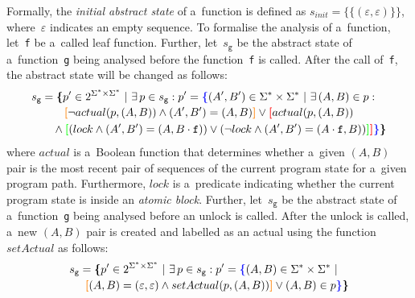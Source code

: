 Formally, the \emph{initial abstract state} of a~function is defined as $ s_{init} = \{\{(\varepsilon, \varepsilon)\}\} $, where~$\varepsilon $ indicates an empty sequence. To formalise the analysis of a~function, let~\texttt{f} be a~called leaf function. Further, let~$ s_\mathtt{g} $ be the abstract state of a~function~\texttt{g} being analysed before the function~\texttt{f} is called. After the call of~\texttt{f}, the abstract state will be changed as follows:
$$
\begin{multlined}
    s_\mathtt{g} = \bb{\{}p^\prime \in 2^{\Sigma^* \times \Sigma^*}\ |\ \exists\,p \in s_\mathtt{g} : p^\prime = \bA{\{} (A^\prime, B^\prime) \in \Sigma^* \times \Sigma^*\ |\ \exists\,(A, B) \in p : \\
%
    \bB{[}\neg actual(p, (A, B)) \wedge (A^\prime, B^\prime) = (A, B)\bB{]} \vee \bC{[}actual(p, (A, B)) \\
%
    \wedge \bD{[}(lock \wedge (A^\prime, B^\prime) = (A, B \cdot \mathtt{f})) \vee (\neg lock \wedge (A^\prime, B^\prime) = (A \cdot \mathtt{f}, B))%
%
    \bD{]}\bC{]}\bA{\}}\bb{\}}
\end{multlined}
$$
where $ actual $ is a~Boolean function that determines whether a~given $ (A, B) $ pair is the most recent pair of sequences of the current program state for a~given program path. Furthermore, $ lock $ is a~predicate indicating whether the current program state is inside an \emph{atomic block}. Further, let~$ s_\mathtt{g} $ be the abstract state of a~function~\texttt{g} being analysed before an unlock is called. After the unlock is called, a~new $ (A, B) $ pair is created and labelled as an actual using the function $ setActual $ as follows:
$$
\begin{multlined}
    s_\mathtt{g} = \bb{\{}p^\prime \in 2^{\Sigma^* \times \Sigma^*}\ |\ \exists\,p \in s_\mathtt{g} : p^\prime = \bA{\{}(A, B) \in \Sigma^* \times \Sigma^*\ | \\
%
    \bB{[}(A, B) = (\varepsilon, \varepsilon) \wedge setActual(p, (A, B))\bB{]} \vee (A, B) \in p%
%
    \bA{\}}\bb{\}}
\end{multlined}
$$

